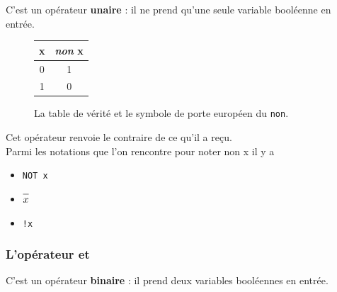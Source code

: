 C'est un opérateur \textbf{unaire} : il ne prend qu'une seule variable booléenne en entrée.
\alternaterowcolors
\begin{figure}[H]
    \begin{center}
        \begin{tabular}{|c|c|}
            \hline\rowcolor{UGLiOrange}
            {\boxfont\color{white}x} & {\boxfont\color{white}\textit{non} x} \\
            \hline
            0                        & 1                                     \\
            \hline
            1                        & 0                                     \\
            \hline
        \end{tabular}
        \hspace{3em}
    \end{center}
    \caption*{La table de vérité et le symbole de porte européen du \texttt{non}.}
\end{figure}



Cet opérateur renvoie \og le contraire de ce qu'il a reçu\fg{}.\\
Parmi les notations que l'on rencontre pour noter \og non x\fg{} il y a
\begin{itemize}
    \item 	 \texttt{NOT x}
    \item 	$\barmin{x}$
    \item 	\texttt{!x}
\end{itemize}


\subsubsection*{L'opérateur \og et\fg{}}

C'est un opérateur \textbf{binaire} : il prend deux variables booléennes en entrée.


